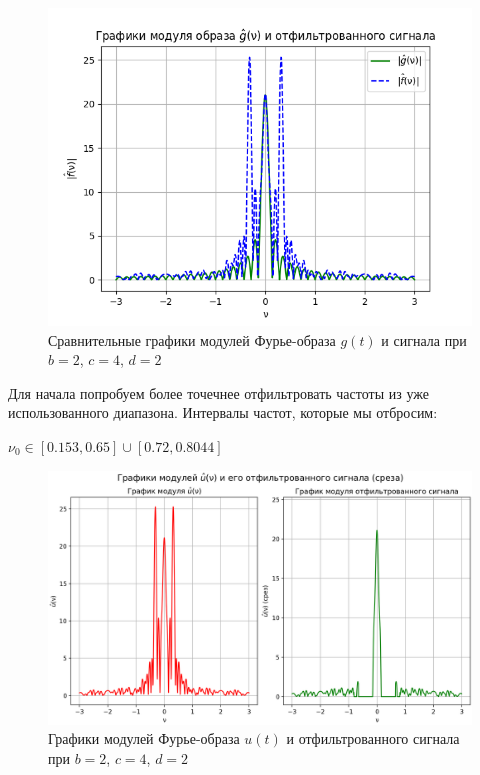 \begin{figure}[ht!]
    \centering
    \includegraphics[scale=0.65]{media/1 task/specific_freq/Image_2_4_2_Begi.png}
    \caption{Сравнительные графики модулей Фурье-образа $g(t)$ и сигнала при  $b=2$,  $c=4$,  $d=2$}
    \label{fig:fourcorig_2_4_2}
\end{figure}

Для начала попробуем более точечнее отфильтровать частоты из уже использованного диапазона. Интервалы частот, которые мы отбросим:

\begin{center}
    $\nu_0 \in [0.153, 0.65] \cup [0.72, 0.8044]$
\end{center}

\begin{figure}[ht!]
    \centering
    \includegraphics[scale=0.55]{media/1 task/specific_freq/Fourier_Image_2_4_2_-0,65:-0,153_-0,8044:-0,72.png}
    \caption{Графики модулей Фурье-образа $u(t)$ и отфильтрованного сигнала при $b=2$,  $c=4$,  $d=2$}
    \label{fig:four_2_4_2_2intervals}
\end{figure}

